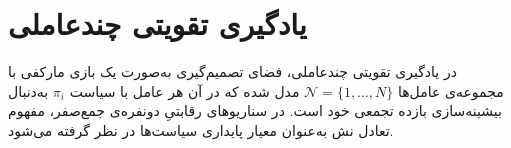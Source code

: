     
    \section{یادگیری تقویتی چندعاملی}\label{sec:marl}

    در یادگیری تقویتی چندعاملی،
     فضای تصمیم‌گیری به‌صورت یک بازی مارکفی
      با مجموعه‌ی عامل‌ها
      {$\mathcal{N}=\{1,\dots,N\}$}
       مدل شده که در آن هر عامل با سیاست {$\pi_i$} به‌دنبال بیشینه‌سازی بازده تجمعی خود است. در سناریوهای رقابتیِ دونفره‌ی جمع‌صفر، مفهوم تعادل نش به‌عنوان معیار پایداری سیاست‌ها در نظر گرفته می‌شود.

%



